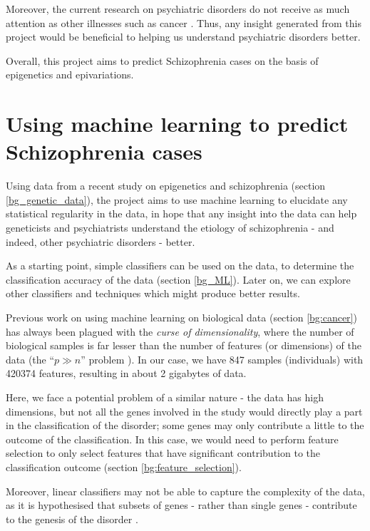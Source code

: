 \documentclass[12pt, twoside, a4paper]{report}
\begin{document}
Moreover, the current research on psychiatric disorders do not receive as much attention as other illnesses such as cancer \cite{RefWorks:82}. Thus, any insight generated from this project would be beneficial to helping us understand psychiatric disorders better.

Overall, this project aims to predict Schizophrenia cases on the basis of epigenetics and epivariations.


\section{Using machine learning to predict Schizophrenia cases} \label{intro_ML}

Using data from a recent study on epigenetics and schizophrenia (section \ref{bg_genetic_data}), the project aims to use machine learning to elucidate any statistical regularity in the data, in hope that any insight into the data can help geneticists and psychiatrists understand the etiology of schizophrenia - and indeed, other psychiatric disorders - better.

As a starting point, simple classifiers can be used on the data, to determine the classification accuracy of the data (section \ref{bg_ML}). Later on, we can explore other classifiers and techniques which might produce better results.

Previous work on using machine learning on biological data (section \ref{bg:cancer}) has always been plagued with the \textit{curse of dimensionality}, where the number of biological samples is far lesser than the number of features (or dimensions) of the data (the ``$p \gg n$'' problem \cite{RefWorks:96}). In our case, we have 847 samples (individuals) with 420374 features, resulting in about 2 gigabytes of data.

Here, we face a potential problem of a similar nature - the data has high dimensions, but not all the genes involved in the study would directly play a part in the classification of the disorder; some genes may only contribute a little to the outcome of the classification. In this case, we would need to perform feature selection to only select features that have significant contribution to the classification outcome (section \ref{bg:feature_selection}).

Moreover, linear classifiers may not be able to capture the complexity of the data, as it is hypothesised that subsets of genes - rather than single genes - contribute to the genesis of the disorder \cite{RefWorks:10}.
\end{document}
